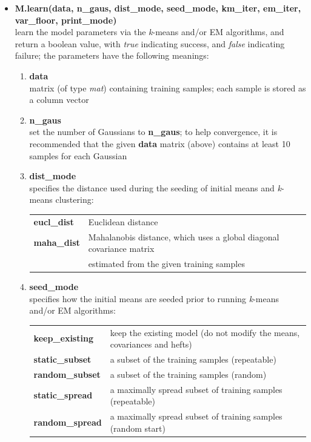 \begin{small}
\begin{itemize}
\newpage

\item
{\bf M.learn(data, n\_gaus, dist\_mode, seed\_mode, km\_iter, em\_iter, var\_floor, print\_mode)}\\
learn the model parameters via the {\it k}-means and/or EM algorithms,
and return a boolean value, with {\it true} indicating success, and {\it false} indicating failure;
the parameters have the following meanings:

\begin{enumerate}[{$\cdot$}]
\item
{\bf data}\\
matrix (of type {\it mat}) containing training samples; each sample is stored as a column vector

\item
{\bf n\_gaus}\\
set the number of Gaussians to {\bf n\_gaus};
to help convergence, it is recommended that the given {\bf data} matrix (above)
contains at least 10 samples for each Gaussian

\item
{\bf dist\_mode}\\
specifies the distance used during the seeding of initial means and {\it k}-means clustering:

\begin{tabular}{ll}
{\bf eucl\_dist} & Euclidean distance\\
{\bf maha\_dist} & Mahalanobis distance, which uses a global diagonal covariance matrix\\
                 & estimated from the given training samples
\end{tabular}

\item
{\bf seed\_mode}\\
specifies how the initial means are seeded prior to running {\it k}-means and/or EM algorithms:

\begin{tabular}{ll}
{\bf keep\_existing} & keep the existing model (do not modify the means, covariances and hefts) \\
{\bf static\_subset} & a subset of the training samples (repeatable) \\
{\bf random\_subset} & a subset of the training samples (random) \\
{\bf static\_spread} & a maximally spread subset of training samples (repeatable) \\
{\bf random\_spread} & a maximally spread subset of training samples (random start)
\end{tabular}


\end{enumerate}
\end{itemize}
\end{small}
